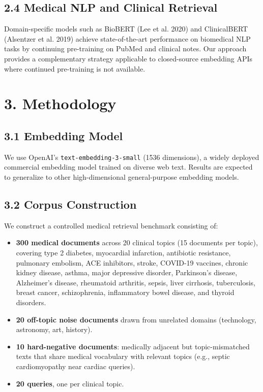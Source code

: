 \documentclass[
  11pt,
  letterpaper,
]{article}
\providecommand{\tightlist}{%
  \setlength{\itemsep}{0pt}\setlength{\parskip}{0pt}}
\begin{document}
\subsection{2.4 Medical NLP and Clinical
Retrieval}\label{medical-nlp-and-clinical-retrieval}

Domain-specific models such as BioBERT (Lee et al. 2020) and
ClinicalBERT (Alsentzer et al. 2019) achieve state-of-the-art
performance on biomedical NLP tasks by continuing pre-training on PubMed
and clinical notes. Our approach provides a complementary strategy
applicable to closed-source embedding APIs where continued pre-training
is not available.

\section{3. Methodology}\label{methodology}

\subsection{3.1 Embedding Model}\label{embedding-model}

We use OpenAI's \texttt{text-embedding-3-small} (1536 dimensions), a
widely deployed commercial embedding model trained on diverse web text.
Results are expected to generalize to other high-dimensional
general-purpose embedding models.

\subsection{3.2 Corpus Construction}\label{corpus-construction}

We construct a controlled medical retrieval benchmark consisting of:

\begin{itemize}
\tightlist
\item
  \textbf{300 medical documents} across 20 clinical topics (15 documents
  per topic), covering type 2 diabetes, myocardial infarction,
  antibiotic resistance, pulmonary embolism, ACE inhibitors, stroke,
  COVID-19 vaccines, chronic kidney disease, asthma, major depressive
  disorder, Parkinson's disease, Alzheimer's disease, rheumatoid
  arthritis, sepsis, liver cirrhosis, tuberculosis, breast cancer,
  schizophrenia, inflammatory bowel disease, and thyroid disorders.
\item
  \textbf{20 off-topic noise documents} drawn from unrelated domains
  (technology, astronomy, art, history).
\item
  \textbf{10 hard-negative documents}: medically adjacent but
  topic-mismatched texts that share medical vocabulary with relevant
  topics (e.g., septic cardiomyopathy near cardiac queries).
\item
  \textbf{20 queries}, one per clinical topic.
\end{itemize}
\end{document}
